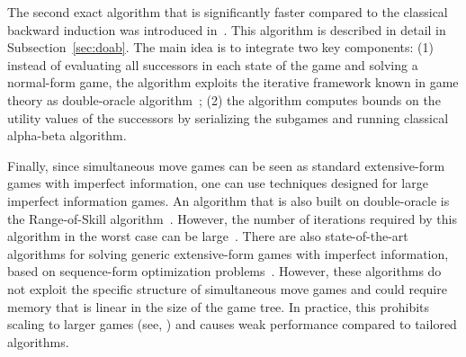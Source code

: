 
The second exact algorithm that is significantly faster compared to the classical backward induction was introduced in~\cite{Bosansky13Using}.
This algorithm is described in detail in Subsection~\ref{sec:doab}. The main idea is to integrate two key components: (1) instead of evaluating all successors in each state of the game and solving a normal-form game, the algorithm exploits the iterative framework known in game theory as double-oracle algorithm~\cite{McMahan03Planning}; (2) the algorithm computes bounds on the utility values of the successors by serializing the subgames and running classical alpha-beta algorithm. 

Finally, since simultaneous move games can be seen as standard extensive-form games with imperfect information, one can use techniques 
designed for large imperfect information games. 
An algorithm that is also built on double-oracle is the Range-of-Skill algorithm~\cite{Zinkevich07New}.  
However, the number of iterations required by this algorithm in the worst case can be large~\cite{Hansen08On}. 
There are also state-of-the-art algorithms for solving generic extensive-form games with imperfect information, based on sequence-form 
optimization problems~\cite{koller1996,Sandholm10The,bosansky2013-aamas}. 
However, these algorithms do not exploit the specific structure of simultaneous move games and could require memory that is linear 
in the size of the game tree. In practice, this prohibits scaling to larger games (see, \eg \cite{Saffidine12SMAB}) and causes weak performance
compared to tailored algorithms.

